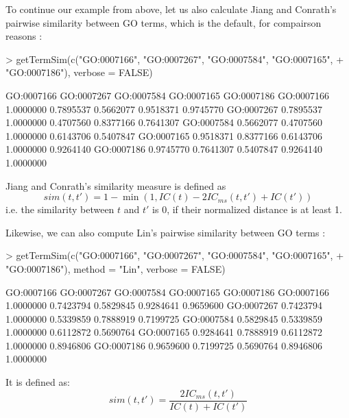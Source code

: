 \documentclass[12pt,a4paper]{article}
\begin{document}
To continue our example from above, let us also calculate Jiang and Conrath's pairwise similarity between GO terms, which is the default, for compairson reasons \cite{Jiang98}:
\begin{Schunk}
\begin{Sinput}
> getTermSim(c("GO:0007166", "GO:0007267", "GO:0007584", "GO:0007165", 
+     "GO:0007186"), verbose = FALSE)
\end{Sinput}
\begin{Soutput}
           GO:0007166 GO:0007267 GO:0007584 GO:0007165 GO:0007186
GO:0007166  1.0000000  0.7895537  0.5662077  0.9518371  0.9745770
GO:0007267  0.7895537  1.0000000  0.4707560  0.8377166  0.7641307
GO:0007584  0.5662077  0.4707560  1.0000000  0.6143706  0.5407847
GO:0007165  0.9518371  0.8377166  0.6143706  1.0000000  0.9264140
GO:0007186  0.9745770  0.7641307  0.5407847  0.9264140  1.0000000
\end{Soutput}
\end{Schunk}
Jiang and Conrath's similarity measure is defined as
\begin{equation}
sim(t,t') = 1 - \min(1, IC(t) - 2IC_{ms}(t,t') + IC(t'))
\end{equation}
i.e. the similarity between $t$ and $t'$ is 0, if their normalized distance is at least 1.

Likewise, we can also compute Lin's pairwise similarity between GO terms \cite{Lin98}:
\begin{Schunk}
\begin{Sinput}
> getTermSim(c("GO:0007166", "GO:0007267", "GO:0007584", "GO:0007165", 
+     "GO:0007186"), method = "Lin", verbose = FALSE)
\end{Sinput}
\begin{Soutput}
           GO:0007166 GO:0007267 GO:0007584 GO:0007165 GO:0007186
GO:0007166  1.0000000  0.7423794  0.5829845  0.9284641  0.9659600
GO:0007267  0.7423794  1.0000000  0.5339859  0.7888919  0.7199725
GO:0007584  0.5829845  0.5339859  1.0000000  0.6112872  0.5690764
GO:0007165  0.9284641  0.7888919  0.6112872  1.0000000  0.8946806
GO:0007186  0.9659600  0.7199725  0.5690764  0.8946806  1.0000000
\end{Soutput}
\end{Schunk}
It is defined as:
\begin{equation}
sim(t,t') = \frac{2IC_{ms}(t,t')}{IC(t) + IC(t')}\label{eq:Lin}
\end{equation}
\end{document}
